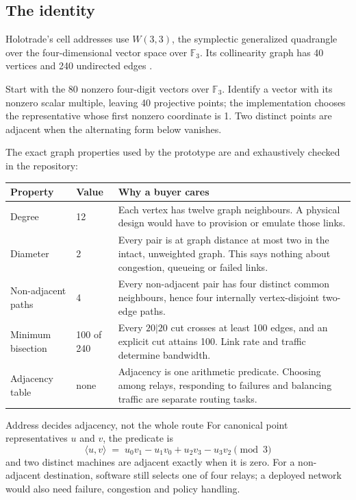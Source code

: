 \documentclass[11pt,letterpaper]{article}
\newcommand{\tagbox}[3]{\tikz[baseline=(X.base)]{\node[inner xsep=3.5pt,inner ysep=1.4pt,rounded corners=1.6pt,fill=#1,text=#2,font=\bfseries\sffamily\tiny] (X) {#3};}}
\newcommand{\PROVED}{\tagbox{greenlite}{green!45!black}{PROVED}}
\newcommand{\W}{\ensuremath{W(3,3)}}
\begin{document}
\subsection{The identity}

Holotrade's cell addresses use \W{}, the symplectic generalized quadrangle over
the four-dimensional vector space over $\mathbb F_3$. Its collinearity graph
has 40 vertices and 240 undirected edges \cite{paynethas}.

\begin{plainbox}
Start with the 80 nonzero four-digit vectors over $\mathbb F_3$. Identify a
vector with its nonzero scalar multiple, leaving 40 projective points; the
implementation chooses the representative whose first nonzero coordinate is 1.
Two distinct points are adjacent when the alternating form below vanishes.
\end{plainbox}

The exact graph properties used by the prototype are \PROVED{} and exhaustively
checked in the repository:

\begin{center}
\renewcommand{\arraystretch}{1.35}
\begin{tabular}{@{}p{} p{} p{}@{}}
\toprule
\textbf{Property} & \textbf{Value} & \textbf{Why a buyer cares} \\
\midrule
Degree & 12 & Each vertex has twelve graph neighbours. A physical design would
have to provision or emulate those links.\\
Diameter & 2 & Every pair is at graph distance at most two in the intact,
unweighted graph. This says nothing about congestion, queueing or failed links.\\
Non-adjacent paths & 4 & Every non-adjacent pair has four distinct common
neighbours, hence four internally vertex-disjoint two-edge paths.\\
Minimum bisection & 100 of 240 & Every $20|20$ cut crosses at least 100 edges,
and an explicit cut attains 100. Link rate and traffic determine bandwidth.\\
Adjacency table & none & Adjacency is one arithmetic predicate. Choosing among
relays, responding to failures and balancing traffic are separate routing tasks.\\
\bottomrule
\end{tabular}
\end{center}

\begin{keybox}{Address decides adjacency, not the whole route}
For canonical point representatives $u$ and $v$, the predicate is
\[
\langle u,v\rangle \;=\; u_0v_1 - u_1v_0 + u_2v_3 - u_3v_2 \pmod 3
\]
and two distinct machines are adjacent exactly when it is zero. For a
non-adjacent destination, software still selects one of four relays; a deployed
network would also need failure, congestion and policy handling.
\end{keybox}
\end{document}
